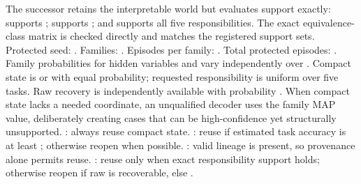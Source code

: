\markdownRendererDocumentBegin
\markdownRendererSectionBegin
{}\markdownRendererInterblockSeparator
{}The successor retains the interpretable world but evaluates support exactly:  supports ;  supports ; and  supports all five responsibilities. The exact equivalence-class matrix is checked directly and matches the registered support sets.\markdownRendererInterblockSeparator
{}Protected seed: . Families: . Episodes per family: . Total protected episodes: .\markdownRendererInterblockSeparator
{}Family probabilities for hidden variables  and  vary independently over \markdownRendererCodeSpan{[0.65,0.95]}. Compact state is  or  with equal probability; requested responsibility is uniform over five tasks. Raw recovery is independently available with probability . When compact state lacks a needed coordinate, an unqualified decoder uses the family MAP value, deliberately creating cases that can be high-confidence yet structurally unsupported.\markdownRendererInterblockSeparator
{}\markdownRendererSectionBegin
{}\markdownRendererInterblockSeparator
{}\markdownRendererOlBeginTight
{}: always reuse compact state.\markdownRendererOlItemEnd 
{}: reuse if estimated task accuracy is at least ; otherwise reopen when possible.\markdownRendererOlItemEnd 
{}: valid lineage is present, so provenance alone permits reuse.\markdownRendererOlItemEnd 
{}: reuse only when exact responsibility support holds; otherwise reopen if raw is recoverable, else .\markdownRendererOlItemEnd 
